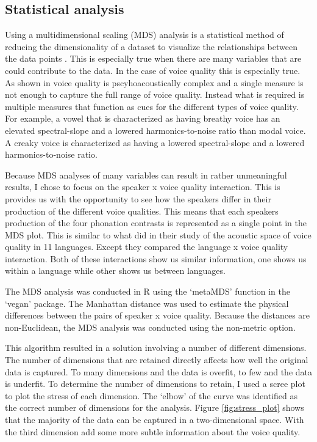 \subsection{Statistical analysis} \label{sec:acousticlandscape:statistics}

Using a multidimensional scaling (MDS) analysis is a statistical method of reducing the dimensionality of a dataset to visualize the relationships between the data points \citep{b.kruskalMultidimensionalScaling1978}. This is especially true when there are many variables that are could contribute to the data. In the case of voice quality this is especially true. As shown in \citet{kreimanUnifiedTheoryVoice2014,kreimanValidatingPsychoacousticModel2021,garellekAcousticDiscriminabilityComplex2020} voice quality is pscyhoacoustically complex and a single measure is not enough to capture the full range of voice quality. Instead what is required is multiple measures that function as cues for the different types of voice quality. For example, a vowel that is characterized as having breathy voice has an elevated spectral-slope and a lowered harmonics-to-noise ratio than modal voice. A creaky voice is characterized as having a lowered spectral-slope and a lowered harmonics-to-noise ratio. 

Because MDS analyses of many variables can result in rather unmeaningful results, I chose to focus on the speaker x voice quality interaction. This is provides us with the opportunity to see how the speakers differ in their production of the different voice qualities. This means that each speakers production of the four phonation contrasts is represented as a single point in the MDS plot. This is similar to what \citet{keatingCrosslanguageAcousticSpace2023} did in their study of the acoustic space of voice quality in 11 languages. Except they compared the language x voice quality interaction. Both of these interactions show us similar information, one shows us within a language while other shows us between languages.

The MDS analysis was conducted in R using the  `metaMDS' function in the `vegan' package. The Manhattan distance was used to estimate the physical differences between the pairs of speaker x voice quality. Because the distances are non-Euclidean, the MDS analysis was conducted using the non-metric option. 

This algorithm resulted in a solution involving a number of different dimensions. The number of dimensions that are retained directly affects how well the original data is captured. To many dimensions and the data is overfit, to few and the data is underfit. To determine the number of dimensions to retain, I used a scree plot to plot the stress of each dimension. The `elbow' of the curve was identified as the correct number of dimensions for the analysis. Figure \ref{fig:stress_plot} shows that the majority of the data can be captured in a two-dimensional space. With the third dimension add some more subtle information about the voice quality.

